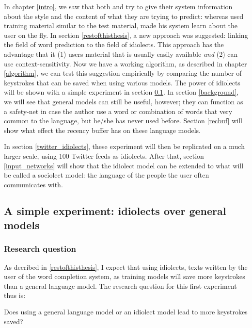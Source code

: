 \documentclass[12pt]{article}
\begin{document}
In chapter \ref{intro}, we saw that both  and  try to give their system information about the style and the content of what they are trying to predict: whereas  used training material similar to the test material,  made his system learn about the user on the fly. In section \ref{restofthisthesis}, a new approach was suggested: linking the field of word prediction to the field of idiolects. This approach has the advantage that it (1) users material that is usually easily available \emph{and} (2) can use context-sensitivity. Now we have a working algorithm, as described in chapter \ref{algorithm}, we can test this suggestion empirically by comparing the number of keystrokes that can be saved when using various models. The power of idiolects will be shown with a simple experiment in section \ref{simple_exp}. In section \ref{background}, we will see that general models can still be useful, however; they can function as a safety-net in case the author use a word or combination of words that very common to the language, but he/she has never used before. Section \ref{recbuf} will show what effect the recency buffer has on these language models.

In section \ref{twitter_idiolects}, these experiment will then be replicated on a much larger scale, using 100 Twitter feeds as idiolects. After that, section \ref{input_networks} will show that the idiolect model can be extended to what will be called a sociolect model: the language of the people the user often communicates with.

\subsection{A simple experiment: idiolects over general models} \label{simple_exp}

\subsubsection{Research question}
As decribed in \ref{restofthisthesis}, I expect that using idiolects, texts written by the user of the word completion system, as training models will save more keystrokes than a general language model. The research question for this first experiment thus is:

\begin{examples}

\item Does using a general language model or an idiolect model lead to more keystrokes saved?

\end{examples}
\end{document}
